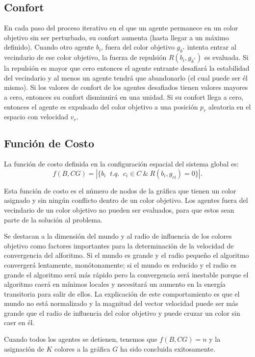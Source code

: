 \documentclass[a4paper]{report}
\begin{document}
\subsection{Confort}

En cada paso del proceso iterativo en el que un agente permanece en un color
objetivo sin ser perturbado, su confort aumenta (hasta llegar a un m\'aximo
definido). Cuando otro agente $b_i$, fuera del color objetivo $g_{k^*}$ intenta
entrar al vecindario de ese color objetivo, la fuerza de repulsi\'on $R(b_i, g_{k^*})$
es evaluada. Si la repulsi\'on es mayor que cero entonces el agente entrante
desafiar\'a la estabilidad del vecindario y al menos un agente tendr\'a que
abandonarlo (el cual puede ser \'el mismo). Si los valores de confort
de los agentes desafiados tienen valores mayores a cero, entonces su confort
disminuir\'a en una unidad. Si su confort llega a cero, entonces el agente
es expulsado del color objetivo a una posici\'on $p_r$ aleatoria en el espacio
con velocidad $v_r$.

\subsection{Funci\'on de Costo}
La funci\'on de costo definida en la configuraci\'on espacial del sistema global es:
\[f(B, CG) = |\{b_i  \ \textit{ t.q. } \ c_i \in C \ \& \ R(b_i, g_{ci}) = 0\}|.\]

Esta funci\'on de costo es el n\'umero de nodos de la gr\'afica que tienen un color
asignado y sin ning\'un conflicto dentro de un color objetivo. Los agentes fuera
del vecindario de un color objetivo no pueden ser evaluados, para que estos sean
parte de la soluci\'on al problema.

Se destacan a la dimensi\'on del mundo y al radio de influencia de los colores
objetivo como factores importantes para la determinaci\'on de la velocidad de
convergencia del alforitmo. Si el mundo es grande y el radio peque\~no el
algoritmo converger\'a lentamente, mon\'otonamente; si el mundo es reducido
y el radio es grande el algoritmo ser\'a m\'as r\'apido pero la convergencia
ser\'a inestable porque el algoritmo caer\'a en m\'inimos locales y necesitar\'a
un aumento en la energ\'ia transitoria para salir de ellos. La explicaci\'on de
este comportamiento es que el mundo no est\'a normalizado y la magnitud del vector
velocidad puede ser m\'as grande que el radio de influencia del color objetivo
y puede cruzar un color sin caer en \'el.

Cuando todos los agentes se detienen, tenemos que $f(B, CG) = n$ y la asignaci\'on
de $K$ colores a la gr\'afica $G$ ha sido concluida exitosamente.
\end{document}
